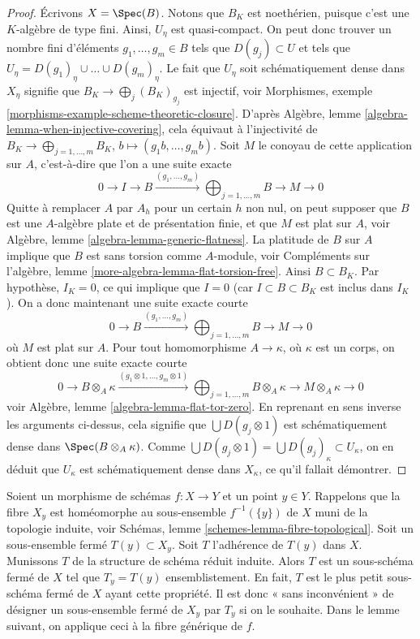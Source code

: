 \begin{proof}
\medskip\noindent
Écrivons $X = \Spec(B)$. Notons que $B_K$ est noethérien, puisque c'est une
$K$-algèbre de type fini. Ainsi, $U_\eta$ est quasi-compact. On peut donc
trouver un nombre fini d'éléments $g_1, \ldots, g_m \in B$ tels que $D(g_j) \subset U$
et tels que $U_\eta = D(g_1)_\eta \cup \ldots \cup D(g_m)_\eta$.
Le fait que $U_\eta$ soit schématiquement dense dans
$X_\eta$ signifie que $B_K \to \bigoplus_j (B_K)_{g_j}$
est injectif, voir
Morphismes, exemple \ref{morphisms-example-scheme-theoretic-closure}.
D'après
Algèbre, lemme \ref{algebra-lemma-when-injective-covering},
cela équivaut à l'injectivité de
$B_K \to \bigoplus\nolimits_{j = 1, \ldots, m} B_K$,
$b \mapsto (g_1b, \ldots, g_mb)$. Soit $M$ le conoyau de cette
application sur $A$, c'est-à-dire que l'on a une suite exacte
$$
0 \to I \to B \xrightarrow{(g_1, \ldots, g_m)}
\bigoplus\nolimits_{j = 1, \ldots, m} B \to M \to 0
$$
Quitte à remplacer $A$ par $A_h$ pour un certain $h$ non nul, on peut supposer que $B$
est une $A$-algèbre plate et de présentation finie, et que $M$
est plat sur $A$, voir
Algèbre, lemme \ref{algebra-lemma-generic-flatness}.
La platitude de $B$ sur $A$ implique que $B$ est sans torsion comme
$A$-module, voir
Compléments sur l'algèbre, lemme \ref{more-algebra-lemma-flat-torsion-free}.
Ainsi $B \subset B_K$. Par hypothèse, $I_K = 0$, ce qui implique que $I = 0$
(car $I \subset B \subset B_K$ est inclus dans $I_K$). On a donc maintenant
une suite exacte courte
$$
0 \to B \xrightarrow{(g_1, \ldots, g_m)}
\bigoplus\nolimits_{j = 1, \ldots, m} B \to M \to 0
$$
où $M$ est plat sur $A$. Pour tout homomorphisme $A \to \kappa$, où
$\kappa$ est un corps, on obtient donc une suite exacte courte
$$
0 \to B \otimes_A \kappa \xrightarrow{(g_1 \otimes 1, \ldots, g_m \otimes 1)}
\bigoplus\nolimits_{j = 1, \ldots, m} B \otimes_A \kappa \to
M \otimes_A \kappa \to 0
$$
voir
Algèbre, lemme \ref{algebra-lemma-flat-tor-zero}.
En reprenant en sens inverse les arguments ci-dessus,
cela signifie que $\bigcup D(g_j \otimes 1)$ est schématiquement
dense dans $\Spec(B \otimes_A \kappa)$.
Comme $\bigcup D(g_j \otimes 1) = \bigcup D(g_j)_\kappa \subset U_\kappa$,
on en déduit que $U_\kappa$ est schématiquement dense dans $X_\kappa$,
ce qu'il fallait démontrer.
\end{proof}

\noindent
Soient un morphisme de schémas $f : X \to Y$ et
un point $y \in Y$. Rappelons que la fibre $X_y$ est homéomorphe
au sous-ensemble $f^{-1}(\{y\})$ de $X$ muni de la topologie induite, voir
Schémas, lemme \ref{schemes-lemma-fibre-topological}.
Soit un sous-ensemble fermé $T(y) \subset X_y$.
Soit $T$ l'adhérence de $T(y)$ dans $X$.
Munissons $T$ de la structure de schéma réduit induite.
Alors $T$ est un sous-schéma fermé de $X$ tel
que $T_y = T(y)$ ensemblistement. En fait, $T$ est le plus petit
sous-schéma fermé de $X$ ayant cette propriété. Il est donc « sans inconvénient »
de désigner un sous-ensemble fermé de $X_y$ par $T_y$ si on le souhaite.
Dans le lemme suivant, on applique ceci à la fibre générique de $f$.

